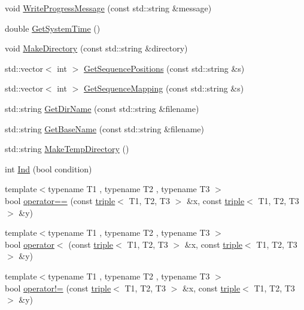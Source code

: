 \begin{DoxyCompactItemize}
void \hyperlink{namespace_c_o_n_t_r_a_l_i_g_n_a8f97b6e8affaf0d7532a88095e5c0c39}{Write\+Progress\+Message} (const std\+::string \&message)
\item 
double \hyperlink{namespace_c_o_n_t_r_a_l_i_g_n_aa4152b19ef26d4c16d6b565b563286d1}{Get\+System\+Time} ()
\item 
void \hyperlink{namespace_c_o_n_t_r_a_l_i_g_n_a56cc93ad68a451ab0bd2681943a2116a}{Make\+Directory} (const std\+::string \&directory)
\item 
std\+::vector$<$ int $>$ \hyperlink{namespace_c_o_n_t_r_a_l_i_g_n_a09a6292733c57477e3ff079b192348d6}{Get\+Sequence\+Positions} (const std\+::string \&s)
\item 
std\+::vector$<$ int $>$ \hyperlink{namespace_c_o_n_t_r_a_l_i_g_n_a93f0680ae281198149502c325fc56d49}{Get\+Sequence\+Mapping} (const std\+::string \&s)
\item 
std\+::string \hyperlink{namespace_c_o_n_t_r_a_l_i_g_n_ac92d12442328b730b130b824cb8e71ba}{Get\+Dir\+Name} (const std\+::string \&filename)
\item 
std\+::string \hyperlink{namespace_c_o_n_t_r_a_l_i_g_n_aac8014733b9d18389b3e410cadf04539}{Get\+Base\+Name} (const std\+::string \&filename)
\item 
std\+::string \hyperlink{namespace_c_o_n_t_r_a_l_i_g_n_ae131464a4805f6186f3df734aed0b5ef}{Make\+Temp\+Directory} ()
\item 
int \hyperlink{namespace_c_o_n_t_r_a_l_i_g_n_ace866af1294f1def70aa7373adc6632d}{Ind} (bool condition)
\item 
{\footnotesize template$<$typename T1 , typename T2 , typename T3 $>$ }\\bool \hyperlink{namespace_c_o_n_t_r_a_l_i_g_n_aed9c0b72e8f62195682d84fb809bed28}{operator==} (const \hyperlink{struct_c_o_n_t_r_a_l_i_g_n_1_1triple}{triple}$<$ T1, T2, T3 $>$ \&x, const \hyperlink{struct_c_o_n_t_r_a_l_i_g_n_1_1triple}{triple}$<$ T1, T2, T3 $>$ \&y)
\item 
{\footnotesize template$<$typename T1 , typename T2 , typename T3 $>$ }\\bool \hyperlink{namespace_c_o_n_t_r_a_l_i_g_n_a00533aeff74d4937d55fc5325493000a}{operator$<$} (const \hyperlink{struct_c_o_n_t_r_a_l_i_g_n_1_1triple}{triple}$<$ T1, T2, T3 $>$ \&x, const \hyperlink{struct_c_o_n_t_r_a_l_i_g_n_1_1triple}{triple}$<$ T1, T2, T3 $>$ \&y)
\item 
{\footnotesize template$<$typename T1 , typename T2 , typename T3 $>$ }\\bool \hyperlink{namespace_c_o_n_t_r_a_l_i_g_n_a18792ba6906e25c2178227113f998924}{operator!=} (const \hyperlink{struct_c_o_n_t_r_a_l_i_g_n_1_1triple}{triple}$<$ T1, T2, T3 $>$ \&x, const \hyperlink{struct_c_o_n_t_r_a_l_i_g_n_1_1triple}{triple}$<$ T1, T2, T3 $>$ \&y)

\end{DoxyCompactItemize}
